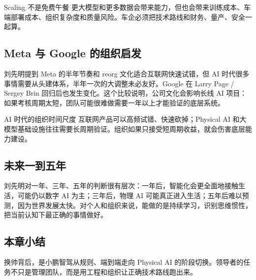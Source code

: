 \begin{warningbox}{Scaling 不是免费午餐}
更大模型和更多数据会带来能力，但也会带来训练成本、车端部署成本、组织复杂度和质量风险。车企必须把技术路线和财务、量产、安全一起算。
\end{warningbox}

\subsection{Meta 与 Google 的组织启发}

刘先明提到 Meta 的半年节奏和 reorg 文化适合互联网快速试错，但 AI 时代很多事情需要从头建体系，半年一次的大调整未必友好。Google 在 Larry Page / Sergey Brin 回归后也发生变化。这个比较说明，公司文化会影响长线 AI 项目：如果考核周期太短，团队可能很难做需要一年以上才能验证的底层系统。

\begin{knowledgebox}{AI 时代的组织时间尺度}
互联网产品可以高频试错、快速砍掉；Physical AI 和大模型基础设施往往需要长周期验证。组织如果只接受短周期收益，就会伤害底层能力建设。
\end{knowledgebox}

\subsection{未来一到五年}

刘先明对一年、三年、五年的判断很有层次：一年后，智能化会更全面地接触生活，可能仍以数字 AI 为主；三年后，物理 AI 可能真正进入生活；五年后难以预测，因为世界发展太快。对个人和组织来说，能做的是持续学习，识别思维惯性，把当前认知下最正确的事情做好。

\subsection{本章小结}

换帅背后，是小鹏智驾从规则、端到端走向 Physical AI 的阶段切换。领导者的任务不只是管理团队，而是用工程和组织让正确技术路线跑出来。

